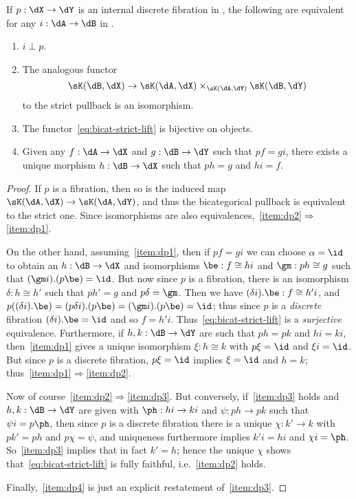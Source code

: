 \begin{lem}\label{thm:dfib-perp}
  If $p:\dX\to\dY$ is an internal discrete fibration in \sK, the following are equivalent for any $i:\dA\to\dB$ in \sK.
  \begin{enumerate}
  \item $i \perp p$.\label{item:dp1}
  \item The analogous functor
    \begin{equation}
      \sK(\dB,\dX) \to \sK(\dA,\dX) \times_{\sK(\dA,\dY)} \sK(\dB,\dY)\label{eq:bicat-strict-lift}
    \end{equation}
    to the strict pullback is an isomorphism.\label{item:dp2}
  \item The functor~\eqref{eq:bicat-strict-lift} is bijective on objects.\label{item:dp3}
  \item Given any $f:\dA\to\dX$ and $g:\dB\to\dY$ such that $p f = g i$, there exists a unique morphism $h:\dB\to \dX$ such that $p h = g$ and $h i = f$.\label{item:dp4}
  \end{enumerate}
\end{lem}
\begin{proof}
  If $p$ is a fibration, then so is the induced map $\sK(\dA,\dX) \to \sK(\dA,\dY)$, and thus the bicategorical pullback is equivalent to the strict one.
  Since isomorphisms are also equivalences,~\ref{item:dp2}$\Rightarrow$\ref{item:dp1}.

  On the other hand, assuming~\ref{item:dp1}, then if $p f = g i$ we can choose $\alpha = \id$ to obtain an $h:\dB\to \dX$ and isomorphisms $\be:f \cong h i$ and $\gm : p h \cong g$ such that $(\gm i).(p\be) = \id$.
  But now since $p$ is a fibration, there is an isomorphism $\delta:h\cong h'$ such that $p h' = g$ and $p \delta = \gm$.
  Then we have $(\delta i).\be : f \cong h' i$, and $p((\delta i).\be) = (p\delta i).(p\be) = (\gm i).(p\be) = \id$; thus since $p$ is a \emph{discrete} fibration $(\delta i).\be = \id$ and so $f = h' i$.
  Thus~\eqref{eq:bicat-strict-lift} is a \emph{surjective} equivalence.
  Furthermore, if $h,k :\dB\to \dY$ are such that $p h = p k$ and $h i = k i$, then~\ref{item:dp1} gives a unique isomorphism $\xi : h\cong k$ with $p \xi = \id$ and $\xi i = \id$.
  But since $p$ is a discrete fibration, $p \xi = \id$ implies $\xi=\id$ and $h=k$; thus~\ref{item:dp1}$\Rightarrow$\ref{item:dp2}.

  Now of course~\ref{item:dp2}$\Rightarrow$\ref{item:dp3}.
  But conversely, if~\ref{item:dp3} holds and $h,k:\dB\to\dY$ are given with $\ph:h i \to k i$ and $\psi : p h \to p k$ such that $\psi i = p \ph$, then since $p$ is a discrete fibration there is a unique $\chi : k'\to k$ with $p k' = p h$ and $p \chi = \psi$, and uniqueness furthermore implies $k' i = h i$ and $\chi i = \ph$.
  So~\ref{item:dp3} implies that in fact $k' = h$; hence the unique $\chi$ shows that~\eqref{eq:bicat-strict-lift} is fully faithful, i.e.~\ref{item:dp2} holds.

  Finally,~\ref{item:dp4} is just an explicit restatement of~\ref{item:dp3}.
\end{proof}

